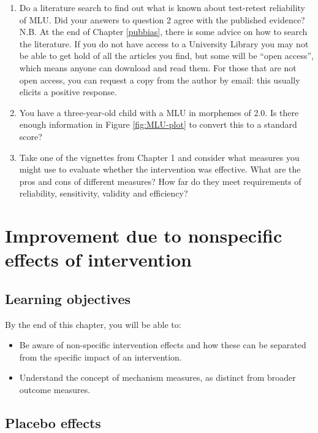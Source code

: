 \documentclass{krantz}
\begin{document}
\begin{enumerate}
\def\labelenumi{\arabic{enumi}.}
\setcounter{enumi}{2}
\item
  Do a literature search to find out what is known about test-retest reliability of MLU. Did your answers to question 2 agree with the published evidence? N.B. At the end of Chapter \ref{pubbias}, there is some advice on how to search the literature. If you do not have access to a University Library you may not be able to get hold of all the articles you find, but some will be ``open access'', which means anyone can download and read them. For those that are not open access, you can request a copy from the author by email: this usually elicits a positive response.
\item
  You have a three-year-old child with a MLU in morphemes of 2.0. Is there enough information in Figure \ref{fig:MLU-plot} to convert this to a standard score?
\item
  Take one of the vignettes from Chapter 1 and consider what measures you might use to evaluate whether the intervention was effective. What are the pros and cons of different measures? How far do they meet requirements of reliability, sensitivity, validity and efficiency?
\end{enumerate}

\hypertarget{nonspecific}{%
\chapter{Improvement due to nonspecific effects of intervention}\label{nonspecific}}

\hypertarget{learning-objectives-3}{%
\section{Learning objectives}\label{learning-objectives-3}}

By the end of this chapter, you will be able to:

\begin{itemize}
\item
  Be aware of non-specific intervention effects and how these can be separated from the specific impact of an intervention.
\item
  Understand the concept of mechanism measures, as distinct from broader outcome measures.
\end{itemize}

\hypertarget{placebo-effects}{%
\section{Placebo effects}\label{placebo-effects}}
\end{document}
